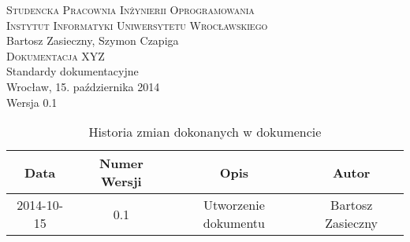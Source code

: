 \documentclass[12pt,a4paper]{report}
\begin{document}
\begin{titlepage}
\begin{center}
\textsc{Studencka Pracownia Inżynierii Oprogramowania}\\[0.5cm]
\textsc{Instytut Informatyki Uniwersytetu Wrocławskiego}\\[8.3cm]

Bartosz Zasieczny, Szymon Czapiga\\[1.0cm]

\textsc{\LARGE{Dokumentacja XYZ}}\\[1.0cm]

Standardy dokumentacyjne\\[8.3cm]

Wrocław, 15. października 2014\\[0.5cm]
Wersja 0.1
\end{center}
\end{titlepage}

\begin{table}[h!]
 \caption{Historia zmian dokonanych w dokumencie}
  \begin{center}
    \begin{tabular}{| c | c | c | c |}
    \hline
    Data & Numer Wersji & Opis & Autor \\
    \hline \hline
    2014-10-15 & 0.1 & Utworzenie dokumentu & Bartosz Zasieczny \\
    \hline
    \end{tabular}
  \end{center}
  
\end{table}
\end{document}
